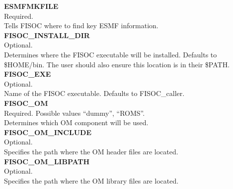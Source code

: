 \documentclass[12pt]{article}
\begin{document}
\begin{flushleft}
\textbf{ESMFMKFILE}                                \\ 
Required.                                          \\
Tells FISOC where to find key ESMF information.    \\
\vspace{6pt}
\textbf{FISOC\_INSTALL\_DIR}                       \\ 
Optional.                                          \\
Determines where the FISOC executable will be installed. Defaults to \$HOME/bin. 
The user should also ensure this location is in their \$PATH. \\
\vspace{6pt}
\textbf{FISOC\_EXE}                                \\ 
Optional.                                          \\
Name of the FISOC executable.  Defaults to FISOC\_caller. \\
\vspace{6pt}
\textbf{FISOC\_OM}                                 \\ 
Required. Possible values ``dummy'', ``ROMS''.     \\
Determines which OM component will be used.        \\
\vspace{6pt}
\textbf{FISOC\_OM\_INCLUDE}                         \\ 
Optional.                                           \\
Specifies the path where the OM header files are located.\\
\vspace{6pt}
\textbf{FISOC\_OM\_LIBPATH}                         \\
Optional.                                           \\
Specifies the path where the OM library files are located.\\
\vspace{6pt}

\end{flushleft}
\end{document}
